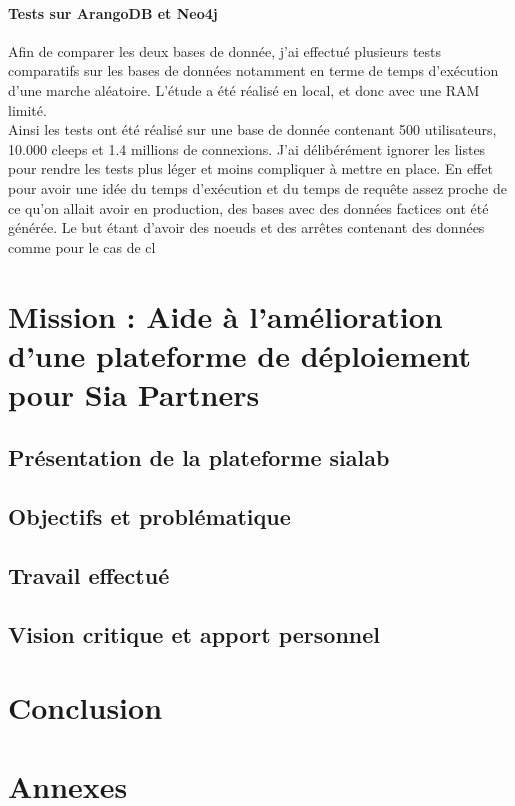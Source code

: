 \documentclass{article} %
\begin{document}
\paragraph{Tests sur ArangoDB et Neo4j\\}
Afin de comparer les deux bases de donnée, j'ai effectué plusieurs tests comparatifs sur les bases de données notamment en terme de temps d'exécution d'une marche aléatoire. L'étude a été réalisé en local, et donc avec une RAM limité.\\
Ainsi les tests ont été réalisé sur une base de donnée contenant 500 utilisateurs, 10.000 cleeps et 1.4 millions de connexions. J'ai délibérément ignorer les listes pour rendre les tests plus léger et moins compliquer à mettre en place. En effet pour avoir une idée du temps d'exécution et du temps de requête assez proche de ce qu'on allait avoir en production, des bases avec des données factices ont été générée. Le but étant d'avoir des noeuds et des arrêtes contenant des données comme pour le cas de cl	


\newpage

\section{Mission : Aide à l'amélioration d'une plateforme de déploiement pour Sia Partners}
\subsection{Présentation de la plateforme sialab}
\subsection{Objectifs et problématique}
\subsection{Travail effectué}
\subsection{Vision critique et apport personnel}
\newpage


\section{Conclusion}
\newpage

\section{Annexes}
\end{document}
